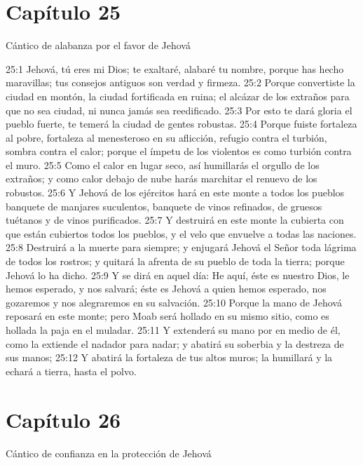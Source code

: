 \section*{Capítulo 25}
Cántico de alabanza por el favor de Jehová 
 
25:1 Jehová, tú eres mi Dios; te exaltaré, alabaré tu nombre, porque has hecho maravillas; tus consejos antiguos son verdad y firmeza. 
25:2 Porque convertiste la ciudad en montón, la ciudad fortificada en ruina; el alcázar de los extraños para que no sea ciudad, ni nunca jamás sea reedificado. 
25:3 Por esto te dará gloria el pueblo fuerte, te temerá la ciudad de gentes robustas. 
25:4 Porque fuiste fortaleza al pobre, fortaleza al menesteroso en su aflicción, refugio contra el turbión, sombra contra el calor; porque el ímpetu de los violentos es como turbión contra el muro. 
25:5 Como el calor en lugar seco, así humillarás el orgullo de los extraños; y como calor debajo de nube harás marchitar el renuevo de los robustos. 
25:6 Y Jehová de los ejércitos hará en este monte a todos los pueblos banquete de manjares suculentos, banquete de vinos refinados, de gruesos tuétanos y de vinos purificados. 
25:7 Y destruirá en este monte la cubierta con que están cubiertos todos los pueblos, y el velo que envuelve a todas las naciones. 
25:8 Destruirá a la muerte para siempre; y enjugará Jehová el Señor toda lágrima de todos los rostros; y quitará la afrenta de su pueblo de toda la tierra; porque Jehová lo ha dicho. 
25:9 Y se dirá en aquel día: He aquí, éste es nuestro Dios, le hemos esperado, y nos salvará; éste es Jehová a quien hemos esperado, nos gozaremos y nos alegraremos en su salvación. 
25:10 Porque la mano de Jehová reposará en este monte; pero Moab será hollado en su mismo sitio, como es hollada la paja en el muladar. 
25:11 Y extenderá su mano por en medio de él, como la extiende el nadador para nadar; y abatirá su soberbia y la destreza de sus manos; 
25:12 Y abatirá la fortaleza de tus altos muros; la humillará y la echará a tierra, hasta el polvo. 
\section*{Capítulo 26 }
Cántico de confianza en la protección de Jehová 
 
